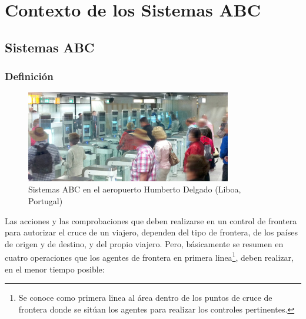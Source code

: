 \chapter{Contexto de los Sistemas ABC}\label{ch:introSistemasABC}

\section{Sistemas ABC}\label{sec:sistemasABC}

\subsection{Definición}

\begin{figure}
    \centering
    \includegraphics[width=0.8\textwidth]{ch-sistemasABC/images/ch-SistemasABC/ABCsEnElAeropuertoPortugal.png}
    \caption{Sistemas \gls{ABC} en el aeropuerto Humberto Delgado (Liboa, Portugal) \cite{ABC4EUOnline}}
    \label{fig:ABCEnElAeropuerto}
\end{figure}

Las acciones y las comprobaciones que deben realizarse en un control de frontera para autorizar el cruce de un viajero, dependen del tipo de frontera, de los países de origen y de destino, y del propio viajero. Pero, básicamente se resumen en cuatro operaciones que los agentes de frontera en primera linea\footnote{Se conoce como primera linea al área dentro de los puntos de cruce de frontera donde se sitúan los agentes para realizar los controles pertinentes.}, deben realizar, en el menor tiempo posible: 

